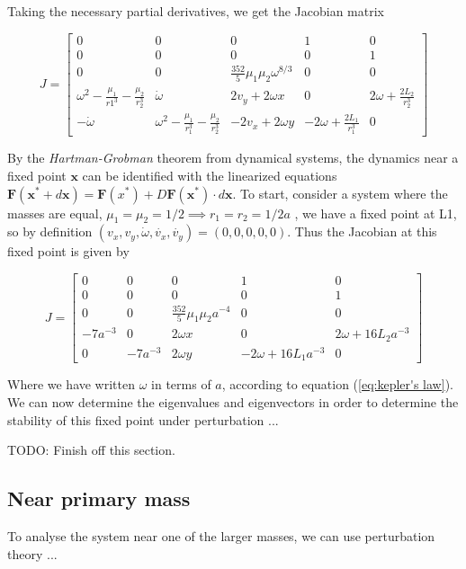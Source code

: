 \documentclass{article}
\begin{document}
Taking the necessary partial derivatives, we get the Jacobian matrix

\[
J = \begin{bmatrix}
    0 & 0 & 0 & 1 & 0 \\
    0 & 0 & 0 & 0 & 1 \\
    0 & 0 & \frac{352}{5} \mu_1 \mu_2 \omega^{8/3} & 0 & 0 \\
    \omega^2-\frac{\mu_1}{r1^3}-\frac{\mu_2}{r_2^3} & \dot{\omega} & 2 v_y + 2 \omega x & 0 & 2 \omega + \frac{2 L_2}{r_2^3} \\
    -\dot{\omega} & \omega^2 - \frac{\mu_1}{r_1^3}-\frac{\mu_2}{r_2^3} & -2 v_x + 2 \omega y & -2 \omega + \frac{2 L_1}{r_1^3} & 0
\end{bmatrix}
\]

By the \textit{Hartman-Grobman} theorem from dynamical systems, the dynamics near a fixed point $\boldsymbol{x}$ can be identified with the linearized equations $\boldsymbol{F}(\boldsymbol{x}^*+d\boldsymbol{x}) = \boldsymbol{F}(x^*)+D\boldsymbol{F}(\boldsymbol{x}^*) \cdot d\boldsymbol{x}$. To start, consider a system where the masses are equal, $\mu_1=\mu_2=1/2 \implies r_1=r_2=1/2 a$ , we have a fixed point at L1, so by definition $(v_x, v_y, \dot{\omega}, \dot{v_x}, \dot{v_y})=(0,0,0,0,0)$. Thus the Jacobian at this fixed point is given by

\[
J = \begin{bmatrix}
    0 & 0 & 0 & 1 & 0 \\
    0 & 0 & 0 & 0 & 1 \\
    0 & 0 & \frac{352}{5} \mu_1 \mu_2 a^{-4} & 0 & 0 \\
    -7 a^{-3} & 0 & 2 \omega x & 0 & 2 \omega + 16 L_2 a^{-3} \\
    0 &  -7a^{-3} & 2 \omega y & -2 \omega + 16 L_1 a^{-3} & 0
\end{bmatrix}
\]

Where we have written $\omega$ in terms of $a$, according to equation (\ref{eq:kepler's law}). We can now determine the eigenvalues and eigenvectors in order to determine the 
stability of this fixed point under perturbation ...

TODO: Finish off this section.

\subsection{Near primary mass}

To analyse the system near one of the larger masses, we can use perturbation theory ...
\end{document}

